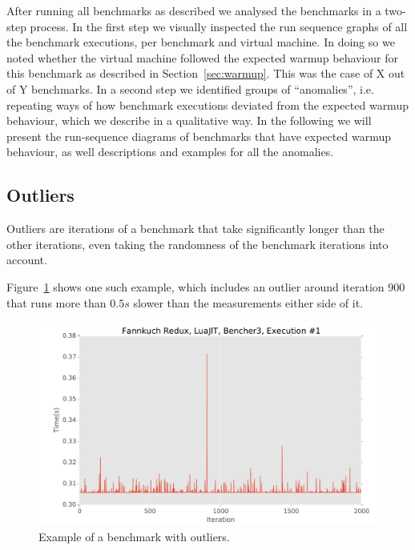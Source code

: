 \documentclass[10pt,preprint]{sigplanconf}
\begin{document}

After running all benchmarks as described we analysed the benchmarks in a
two-step process. In the first step we visually inspected the run sequence
graphs of all the benchmark executions, per benchmark and virtual machine. In
doing so we noted whether the virtual machine followed the expected warmup
behaviour for this benchmark as described in Section~\ref{sec:warmup}. This was
the case of  X out of Y benchmarks. In a second step we
identified groups of ``anomalies'', i.e. repeating ways of how benchmark
executions deviated from the expected warmup behaviour, which we describe in a
qualitative way. In the following we will
present the run-sequence diagrams of benchmarks that have expected warmup
behaviour, as well descriptions and examples for all the anomalies.






\subsection{Outliers}
\label{sub:outliers}

Outliers are iterations of a benchmark that take significantly longer than the
other iterations, even taking the randomness of the benchmark iterations into
account.

Figure~\ref{fig:examples:outliers1} shows one such example, which includes an
outlier around iteration $900$ that runs more than $0.5s$ slower than the
measurements either side of it.

\begin{figure}[h!]
\centering
\includegraphics[width=.46\textwidth]{examples/outliers1}
\caption{Example of a benchmark with outliers.}
\label{fig:examples:outliers1}
\end{figure}
\end{document}
